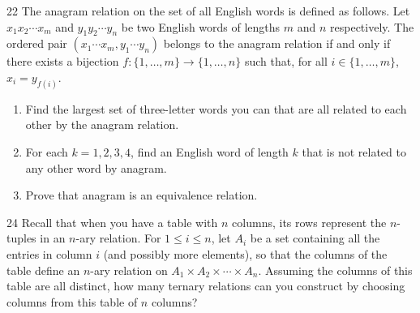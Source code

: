 \documentclass[11pt]{article}
\begin{document}
\begin{exercise}{22}
    The anagram relation on the set of all English words is defined
    as follows. Let $x_1x_2\cdots x_m$ and $y_1y_2\cdots y_n$ be two
    English words of lengths $m$ and $n$ respectively. The ordered
    pair $(x_1\cdots x_m, y_1\cdots y_n)$ belongs to the anagram
    relation if and only if there exists a bijection
    $f:\{1,\dots,m\}\to\{1,\dots,n\}$ such that, for all
    $i\in\{1,\dots,m\}$, $x_i=y_{f(i)}$.
    \begin{enumerate}[label=(\alph*)]
        \item Find the largest set of three-letter words you can
            that are all related to each other by the anagram
            relation.
        \item For each $k=1,2,3,4$, find an English word of length
            $k$ that is not related to any other word by anagram.
        \item Prove that anagram is an equivalence relation.
    \end{enumerate}
\end{exercise}
\begin{solution}[(a)]

\end{solution}
\begin{solution}[(b)]

\end{solution}
\begin{solution}[(c)]

\end{solution}

\begin{exercise}{24}
    Recall that when you have a table with $n$ columns, its rows
    represent the $n$-tuples in an $n$-ary relation. For $1\le i\le
    n$, let $A_i$ be a set containing all the entries in column $i$
    (and possibly more elements), so that the columns of the table
    define an $n$-ary relation on $A_1\times A_2\times\cdots\times
    A_n$. Assuming the columns of this table are all distinct, how
    many ternary relations can you construct by choosing columns from
    this table of $n$ columns?
\end{exercise}
\begin{solution}

\end{solution}
\end{document}
